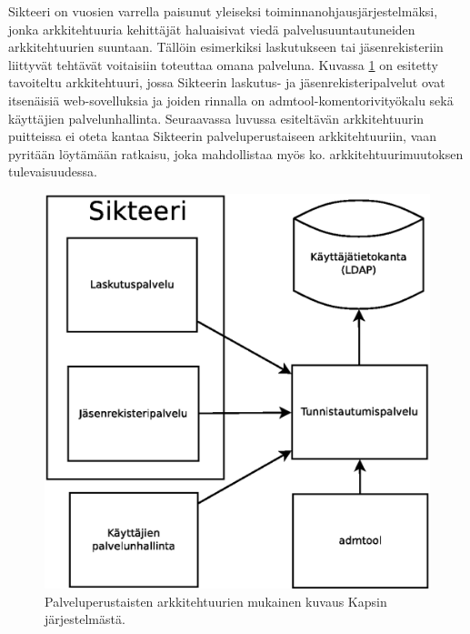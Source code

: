 Sikteeri on vuosien varrella paisunut yleiseksi toiminnanohjausjärjestelmäksi, jonka arkkitehtuuria kehittäjät haluaisivat viedä palvelusuuntautuneiden arkkitehtuurien suuntaan. Tällöin esimerkiksi laskutukseen tai jäsenrekisteriin liittyvät tehtävät voitaisiin toteuttaa omana palveluna. Kuvassa \ref{kapsi_uusi} on esitetty tavoiteltu arkkitehtuuri, jossa Sikteerin laskutus- ja jäsenrekisteripalvelut ovat itsenäisiä web-sovelluksia ja joiden rinnalla on admtool-komentorivityökalu sekä käyttäjien palvelunhallinta. Seuraavassa luvussa esiteltävän arkkitehtuurin puitteissa ei oteta kantaa Sikteerin palveluperustaiseen arkkitehtuuriin, vaan pyritään löytämään ratkaisu, joka mahdollistaa myös ko. arkkitehtuurimuutoksen tulevaisuudessa.

\begin{figure}[ht]
\centering
\includegraphics[width=.7\textwidth]{toteutus/muutostarve/kapsi_uusi_soa.eps}
\caption{Palveluperustaisten arkkitehtuurien mukainen kuvaus Kapsin järjestelmästä.}%
\label{kapsi_uusi}
\end{figure}